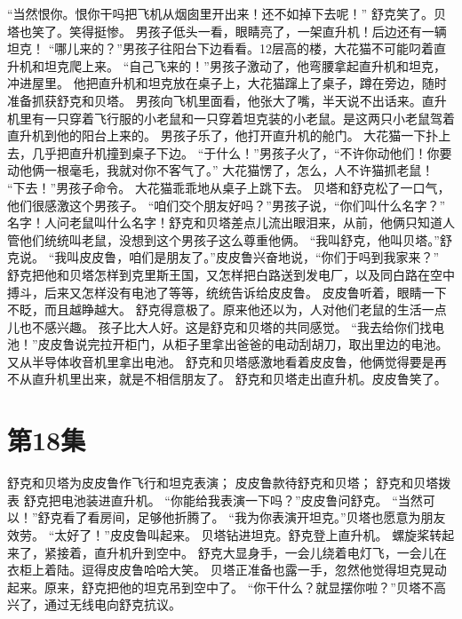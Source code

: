 \documentclass[a4paper,12pt,UTF8,twoside]{ctexbook}
\begin{document}
        “当然恨你。恨你干吗把飞机从烟囱里开出来！还不如掉下去呢！” 
        舒克笑了。贝塔也笑了。笑得挺惨。 
        男孩子低头一看，眼睛亮了，一架直升机！后边还有一辆坦克！ 
        “哪儿来的？”男孩子往阳台下边看看。12层高的楼，大花猫不可能叼着直升机和坦克爬上来。 
        “自己飞来的！”男孩子激动了，他弯腰拿起直升机和坦克，冲进屋里。 
        他把直升机和坦克放在桌子上，大花猫蹿上了桌子，蹲在旁边，随时准备抓获舒克和贝塔。 
        男孩向飞机里面看，他张大了嘴，半天说不出话来。直升机里有一只穿着飞行服的小老鼠和一只穿着坦克装的小老鼠。是这两只小老鼠驾着直升机到他的阳台上来的。 
        男孩子乐了，他打开直升机的舱门。 
        大花猫一下扑上去，几乎把直升机撞到桌子下边。 
        “于什么！”男孩子火了，“不许你动他们！你要动他俩一根毫毛，我就对你不客气了。” 
        大花猫愣了，怎么，人不许猫抓老鼠！ 
        “下去！”男孩子命令。 
        大花猫乖乖地从桌子上跳下去。 
        贝塔和舒克松了一口气，他们很感激这个男孩子。 
        “咱们交个朋友好吗？”男孩子说，“你们叫什么名字？” 
        名字！人问老鼠叫什么名字！舒克和贝塔差点儿流出眼泪来，从前，他俩只知道人管他们统统叫老鼠，没想到这个男孩子这么尊重他俩。 
        “我叫舒克，他叫贝塔。”舒克说。 
        “我叫皮皮鲁，咱们是朋友了。”皮皮鲁兴奋地说，“你们于吗到我家来？” 
        舒克把他和贝塔怎样到克里斯王国，又怎样把白路送到发电厂，以及同白路在空中搏斗，后来又怎样没有电池了等等，统统告诉给皮皮鲁。 
        皮皮鲁听着，眼睛一下不眨，而且越睁越大。 
        舒克得意极了。原来他还以为，人对他们老鼠的生活一点儿也不感兴趣。 
        孩子比大人好。这是舒克和贝塔的共同感觉。 
        “我去给你们找电池！”皮皮鲁说完拉开柜门，从柜子里拿出爸爸的电动刮胡刀，取出里边的电池。又从半导体收音机里拿出电池。 
        舒克和贝塔感激地看着皮皮鲁，他俩觉得要是再不从直升机里出来，就是不相信朋友了。 
        舒克和贝塔走出直升机。皮皮鲁笑了。   \chapter{第18集}   
        舒克和贝塔为皮皮鲁作飞行和坦克表演； 
        皮皮鲁款待舒克和贝塔； 
        舒克和贝塔拨表   
        舒克把电池装进直升机。 
        “你能给我表演一下吗？”皮皮鲁问舒克。 
        “当然可以！”舒克看了看房间，足够他折腾了。 
        “我为你表演开坦克。”贝塔也愿意为朋友效劳。 
        “太好了！”皮皮鲁叫起来。 
        贝塔钻进坦克。舒克登上直升机。 
        螺旋桨转起来了，紧接着，直升机升到空中。 
        舒克大显身手，一会儿绕着电灯飞，一会儿在衣柜上着陆。逗得皮皮鲁哈哈大笑。 
        贝塔正准备也露一手，忽然他觉得坦克晃动起来。原来，舒克把他的坦克吊到空中了。 
        “你干什么？就显摆你啦？”贝塔不高兴了，通过无线电向舒克抗议。 
\end{document}
